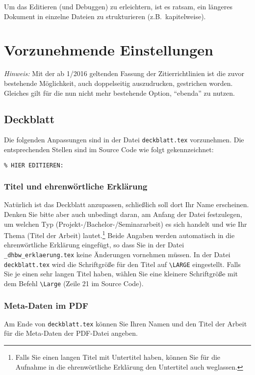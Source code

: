 Um das Editieren (und Debuggen) zu erleichtern, ist es ratsam, ein längeres Dokument in einzelne Dateien zu strukturieren (z.B.\ kapitelweise).

\section{Vorzunehmende Einstellungen}

\emph{Hinweis:} Mit der ab 1/2016 geltenden Fassung der Zitierrichtlinien ist die zuvor bestehende Möglichkeit, auch doppelseitig auszudrucken, gestrichen worden. Gleiches gilt für die nun nicht mehr bestehende Option, \enquote{ebenda} zu nutzen.

\subsection{Deckblatt}

Die folgenden Anpassungen sind in der Datei \verb|deckblatt.tex| vorzunehmen. Die entsprechenden Stellen sind im Source Code wie folgt gekennzeichnet:
\lstset{language=TeX} 
\begin{lstlisting}
% HIER EDITIEREN: 
\end{lstlisting}

\subsubsection{Titel und ehrenwörtliche Erklärung}
Natürlich ist das Deckblatt anzupassen, schließlich soll dort Ihr Name erscheinen. Denken Sie bitte aber auch unbedingt daran, am Anfang der Datei festzulegen, um welchen Typ (Projekt-/Bachelor-/Seminararbeit) es sich handelt und wie Ihr Thema (Titel der Arbeit) lautet.\footnote{%
Falls Sie einen langen Titel mit Untertitel haben, können Sie für die Aufnahme in die ehrenwörtliche Erklärung den Untertitel auch weglassen.} Beide Angaben werden automatisch in die ehrenwörtliche Erklärung eingefügt, so dass Sie in der Datei \verb|_dhbw_erklaerung.tex| keine Änderungen vornehmen müssen.
In der Datei \verb|deckblatt.tex| wird die Schriftgröße für den Titel auf \verb|\LARGE| eingestellt. Falls Sie je einen sehr langen Titel haben, wählen Sie eine kleinere Schriftgröße mit dem Befehl \verb|\Large| (Zeile 21 im Source Code).

\subsubsection{Meta-Daten im PDF}
Am Ende von \verb|deckblatt.tex| können Sie Ihren Namen und den Titel der Arbeit für die Meta-Daten der PDF-Datei angeben. 


